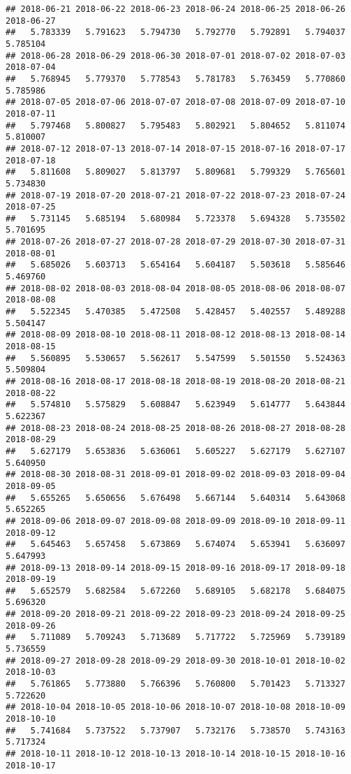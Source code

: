 \documentclass[
]{article}
\begin{document}
\begin{verbatim}
## 2018-06-21 2018-06-22 2018-06-23 2018-06-24 2018-06-25 2018-06-26 2018-06-27 
##   5.783339   5.791623   5.794730   5.792770   5.792891   5.794037   5.785104 
## 2018-06-28 2018-06-29 2018-06-30 2018-07-01 2018-07-02 2018-07-03 2018-07-04 
##   5.768945   5.779370   5.778543   5.781783   5.763459   5.770860   5.785986 
## 2018-07-05 2018-07-06 2018-07-07 2018-07-08 2018-07-09 2018-07-10 2018-07-11 
##   5.797468   5.800827   5.795483   5.802921   5.804652   5.811074   5.810007 
## 2018-07-12 2018-07-13 2018-07-14 2018-07-15 2018-07-16 2018-07-17 2018-07-18 
##   5.811608   5.809027   5.813797   5.809681   5.799329   5.765601   5.734830 
## 2018-07-19 2018-07-20 2018-07-21 2018-07-22 2018-07-23 2018-07-24 2018-07-25 
##   5.731145   5.685194   5.680984   5.723378   5.694328   5.735502   5.701695 
## 2018-07-26 2018-07-27 2018-07-28 2018-07-29 2018-07-30 2018-07-31 2018-08-01 
##   5.685026   5.603713   5.654164   5.604187   5.503618   5.585646   5.469760 
## 2018-08-02 2018-08-03 2018-08-04 2018-08-05 2018-08-06 2018-08-07 2018-08-08 
##   5.522345   5.470385   5.472508   5.428457   5.402557   5.489288   5.504147 
## 2018-08-09 2018-08-10 2018-08-11 2018-08-12 2018-08-13 2018-08-14 2018-08-15 
##   5.560895   5.530657   5.562617   5.547599   5.501550   5.524363   5.509804 
## 2018-08-16 2018-08-17 2018-08-18 2018-08-19 2018-08-20 2018-08-21 2018-08-22 
##   5.574810   5.575829   5.608847   5.623949   5.614777   5.643844   5.622367 
## 2018-08-23 2018-08-24 2018-08-25 2018-08-26 2018-08-27 2018-08-28 2018-08-29 
##   5.627179   5.653836   5.636061   5.605227   5.627179   5.627107   5.640950 
## 2018-08-30 2018-08-31 2018-09-01 2018-09-02 2018-09-03 2018-09-04 2018-09-05 
##   5.655265   5.650656   5.676498   5.667144   5.640314   5.643068   5.652265 
## 2018-09-06 2018-09-07 2018-09-08 2018-09-09 2018-09-10 2018-09-11 2018-09-12 
##   5.645463   5.657458   5.673869   5.674074   5.653941   5.636097   5.647993 
## 2018-09-13 2018-09-14 2018-09-15 2018-09-16 2018-09-17 2018-09-18 2018-09-19 
##   5.652579   5.682584   5.672260   5.689105   5.682178   5.684075   5.696320 
## 2018-09-20 2018-09-21 2018-09-22 2018-09-23 2018-09-24 2018-09-25 2018-09-26 
##   5.711089   5.709243   5.713689   5.717722   5.725969   5.739189   5.736559 
## 2018-09-27 2018-09-28 2018-09-29 2018-09-30 2018-10-01 2018-10-02 2018-10-03 
##   5.761865   5.773880   5.766396   5.760800   5.701423   5.713327   5.722620 
## 2018-10-04 2018-10-05 2018-10-06 2018-10-07 2018-10-08 2018-10-09 2018-10-10 
##   5.741684   5.737522   5.737907   5.732176   5.738570   5.743163   5.717324 
## 2018-10-11 2018-10-12 2018-10-13 2018-10-14 2018-10-15 2018-10-16 2018-10-17 

\end{verbatim}
\end{document}
